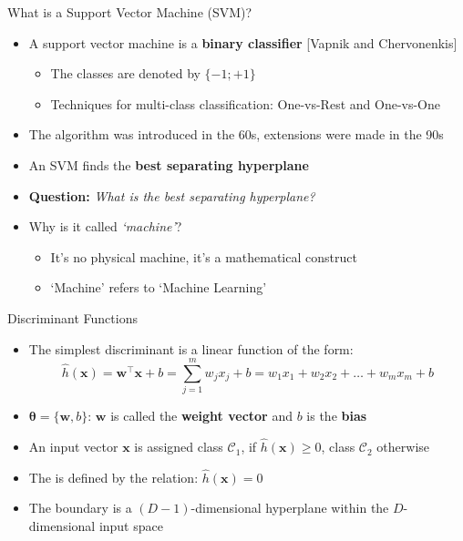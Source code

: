 \begin{frame}{What is a Support Vector Machine (SVM)?}{}
	\begin{itemize}
		\item A support vector machine is a \textbf{binary classifier}
			{\footnotesize [Vapnik and Chervonenkis]}
		\begin{itemize}
			\item The classes are denoted by $\{-1; +1\}$
			\item Techniques for multi-class classification: One-vs-Rest and One-vs-One
		\end{itemize}
		\item The algorithm was introduced in the 60s, extensions were made in the 90s
		\item An SVM finds the \textbf{best separating hyperplane}
		\item \textbf{Question:} \textit{What is the best separating hyperplane?}
		\item Why is it called \textit{`machine'}?
		\begin{itemize}
			\item It's no physical machine, it's a mathematical construct
			\item `Machine' refers to `Machine Learning' 
		\end{itemize}
	\end{itemize}
\end{frame}


\begin{frame}{Discriminant Functions}{}
	\begin{itemize}
		\item The simplest discriminant is a linear function of the form:
		\begin{equation}
			\widehat{h}(\bm{x})
				= \bm{w}^{\intercal} \bm{x} + b
				= \sum_{j=1}^m w_j x_j + b
				= w_1 x_1 + w_2 x_2 + \dots + w_m x_m + b
		\end{equation} 
		\item $\bm{\theta} = \{ \bm{w}, b \}$: $\bm{w}$ is called the \textbf{weight vector} and $b$ is the \textbf{bias}
		\item An input vector $\bm{x}$ is assigned class $\mathcal{C}_1$, if $\widehat{h}(\bm{x}) \ge 0$,
			class $\mathcal{C}_2$ otherwise
		\item The  is defined by the relation: $\widehat{h}(\bm{x}) = 0$
		\item The boundary is a $(D - 1)$-dimensional hyperplane within the $D$-dimensional input space
	\end{itemize}
\end{frame}


